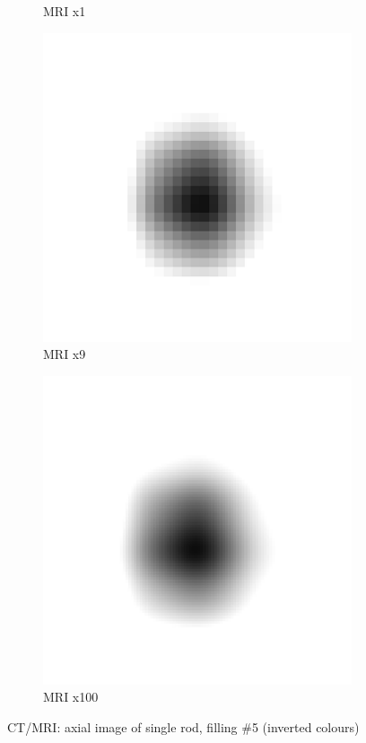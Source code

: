 \documentclass[parskip,bibtotoc,final,twoside=false,titlepage,a4paper,english,12pt,titlepage,a4paper]{scrbook}
\begin{document}
\begin{figure}[!thb]
\begin{subfigure}[b]{0.32\textwidth}
    \caption{MRI x1}
    \label{fig:MRI_x1}
  \end{subfigure}
  \hfill
  \begin{subfigure}[b]{0.32\textwidth}
    \includegraphics[scale=.11]{slicer3D/profiles/MR_x9.png}
    \caption{MRI x9}
    \label{fig:MRI_x9}
  \end{subfigure}
    \hfill
  \begin{subfigure}[b]{0.32\textwidth}
    \includegraphics[scale=.11]{slicer3D/profiles/MR_x100.png}
    \caption{MRI x100}
    \label{fig:MRI_x100}
  \end{subfigure}
  \caption{CT/MRI: axial image of single rod, filling \#5  (inverted colours)}
  \label{fig:resample}
\end{figure}
\clearpage
\end{document}
